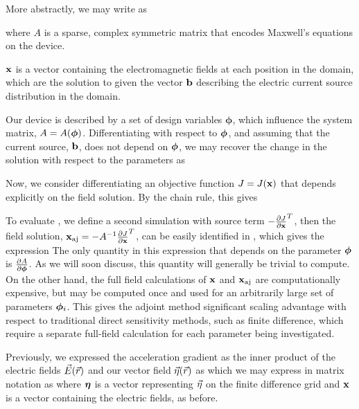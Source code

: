 More abstractly, we may write  as
%

%
where $A$ is a sparse, complex symmetric matrix that encodes Maxwell's equations on the device.

$\mathbf{x}$ is a vector containing the electromagnetic fields at each position in the domain, which are the solution to  given the vector $\mathbf{b}$ describing the electric current source distribution in the domain.

Our device is described by a set of design variables $\bm{\phi}$, which influence the system matrix, $A = A(\bm{\phi})$.
Differentiating  with respect to $\bm{\phi}$, and assuming that the current source, $\mathbf{b}$, does not depend on $\bm{\phi}$, we may recover the change in the solution with respect to the parameters as
%

Now, we consider differentiating an objective function $J = J(\mathbf{x})$ that depends explicitly on the field solution.
By the chain rule, this gives
%

To evaluate , we define a second simulation with source term $-\frac{\partial J}{\partial \mathbf{x}}^T$,
%
%
then the field solution, $\mathbf{x}_{\textrm{aj}} = -A^{-1}\frac{\partial J}{\partial \mathbf{x}}^T$, can be easily identified in , which gives the expression
%
%
The only quantity in this expression that depends on the parameter $\bm{\phi}$ is $\frac{\partial A}{\partial \bm{\phi}}$.
As we will soon discuss, this quantity will generally be trivial to compute.
On the other hand, the full field calculations of $\mathbf{x}$ and $\mathbf{x}_{\textrm{aj}}$ are computationally expensive, but may be computed once and used for an arbitrarily large set of parameters $\bm{\phi}_i$.
This gives the adjoint method significant scaling advantage with respect to traditional direct sensitivity methods, such as finite difference, which require a separate full-field calculation for each parameter being investigated.

Previously, we expressed the acceleration gradient as the inner product of the electric fields $\vec{E}(\vec{r})$ and our vector field $\vec{\eta}(\vec{r})$ as
%
%
which we may express in matrix notation as
%
%
where $\bm{\eta}$ is a vector representing $\vec{\eta}$ on the finite difference grid and $\mathbf{x}$ is a vector containing the electric fields, as before.

